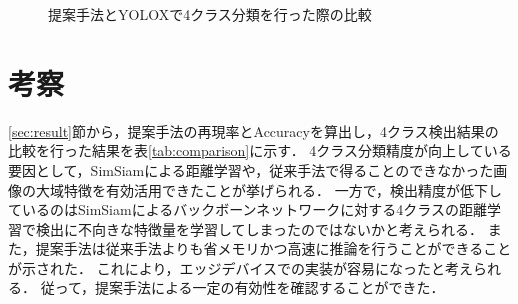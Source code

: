 \documentclass[a4j,8pt,twocolumn]{extarticle}
\begin{document}
        \begin{figure}[!t]
            \centering

            \caption{提案手法とYOLOXで4クラス分類を行った際の比較}
            \label{fig:cmat}
        \end{figure}

    \section{考察}
        \label{sec:consideration}
        \ref{sec:result}節から，提案手法の再現率とAccuracyを算出し，4クラス検出結果の比較を行った結果を表\ref{tab:comparison}に示す．
        4クラス分類精度が向上している要因として，SimSiamによる距離学習や，従来手法で得ることのできなかった画像の大域特徴を有効活用できたことが挙げられる．
        一方で，検出精度が低下しているのはSimSiamによるバックボーンネットワークに対する4クラスの距離学習で検出に不向きな特徴量を学習してしまったのではないかと考えられる．
        また，提案手法は従来手法よりも省メモリかつ高速に推論を行うことができることが示された．
        これにより，エッジデバイスでの実装が容易になったと考えられる．
        従って，提案手法による一定の有効性を確認することができた．
\end{document}
